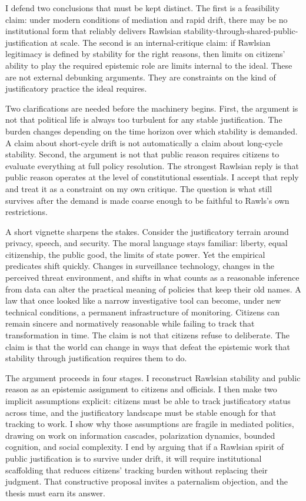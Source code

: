 \documentclass[12pt]{article}
\begin{document}
I defend two conclusions that must be kept distinct. The first is a feasibility claim: under modern conditions of mediation and rapid drift, there may be no institutional form that reliably delivers Rawlsian stability-through-shared-public-justification at scale. The second is an internal-critique claim: if Rawlsian legitimacy is defined by stability for the right reasons, then limits on citizens' ability to play the required epistemic role are limits internal to the ideal. These are not external debunking arguments. They are constraints on the kind of justificatory practice the ideal requires.

Two clarifications are needed before the machinery begins. First, the argument is not that political life is always too turbulent for any stable justification. The burden changes depending on the time horizon over which stability is demanded. A claim about short-cycle drift is not automatically a claim about long-cycle stability. Second, the argument is not that public reason requires citizens to evaluate everything at full policy resolution. The strongest Rawlsian reply is that public reason operates at the level of constitutional essentials. I accept that reply and treat it as a constraint on my own critique. The question is what still survives after the demand is made coarse enough to be faithful to Rawls's own restrictions.

A short vignette sharpens the stakes. Consider the justificatory terrain around privacy, speech, and security. The moral language stays familiar: liberty, equal citizenship, the public good, the limits of state power. Yet the empirical predicates shift quickly. Changes in surveillance technology, changes in the perceived threat environment, and shifts in what counts as a reasonable inference from data can alter the practical meaning of policies that keep their old names. A law that once looked like a narrow investigative tool can become, under new technical conditions, a permanent infrastructure of monitoring. Citizens can remain sincere and normatively reasonable while failing to track that transformation in time. The claim is not that citizens refuse to deliberate. The claim is that the world can change in ways that defeat the epistemic work that stability through justification requires them to do.

The argument proceeds in four stages. I reconstruct Rawlsian stability and public reason as an epistemic assignment to citizens and officials. I then make two implicit assumptions explicit: citizens must be able to track justificatory status across time, and the justificatory landscape must be stable enough for that tracking to work. I show why those assumptions are fragile in mediated politics, drawing on work on information cascades, polarization dynamics, bounded cognition, and social complexity. I end by arguing that if a Rawlsian spirit of public justification is to survive under drift, it will require institutional scaffolding that reduces citizens' tracking burden without replacing their judgment. That constructive proposal invites a paternalism objection, and the thesis must earn its answer.
\end{document}
